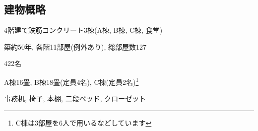 \documentclass[10pt,b5jsbook,dvips,dvipdfmx,openany]{jsbook}
\theoremstyle{definition}
\begin{document}

		\subsection{建物概略}
		\begin{description}
		\item 4階建て鉄筋コンクリート3棟(A棟, B棟, C棟, 食堂)
		\item 築約50年, 各階11部屋(例外あり), 総部屋数127
		\item[定員] 422名
		\item[居室] A棟16畳,  B棟18畳(定員4名), C棟(定員2名)\footnote{C棟は3部屋を6人で用いるなどしています}
		\item[備品] 事務机, 椅子, 本棚, 二段ベッド, クローゼット
		\end{description}




 \newpage
\end{document}
